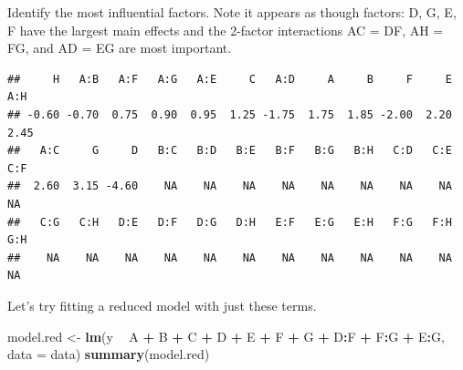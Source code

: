 \documentclass[]{article}
\newenvironment{Shaded}{\begin{snugshade}}{\end{snugshade}}
\newcommand{\DataTypeTok}[1]{\textcolor[rgb]{0.13,0.29,0.53}{#1}}
\newcommand{\DecValTok}[1]{\textcolor[rgb]{0.00,0.00,0.81}{#1}}
\newcommand{\FloatTok}[1]{\textcolor[rgb]{0.00,0.00,0.81}{#1}}
\newcommand{\KeywordTok}[1]{\textcolor[rgb]{0.13,0.29,0.53}{\textbf{#1}}}
\newcommand{\NormalTok}[1]{#1}
\newcommand{\OperatorTok}[1]{\textcolor[rgb]{0.81,0.36,0.00}{\textbf{#1}}}
\newcommand{\OtherTok}[1]{\textcolor[rgb]{0.56,0.35,0.01}{#1}}
\newcommand{\StringTok}[1]{\textcolor[rgb]{0.31,0.60,0.02}{#1}}
\begin{document}
\newpage

Identify the most influential factors. Note it appears as though
factors: D, G, E, F have the largest main effects and the 2-factor
interactions AC = DF, AH = FG, and AD = EG are most important.

\begin{Shaded}
\end{Shaded}

\begin{verbatim}
##     H   A:B   A:F   A:G   A:E     C   A:D     A     B     F     E   A:H 
## -0.60 -0.70  0.75  0.90  0.95  1.25 -1.75  1.75  1.85 -2.00  2.20  2.45 
##   A:C     G     D   B:C   B:D   B:E   B:F   B:G   B:H   C:D   C:E   C:F 
##  2.60  3.15 -4.60    NA    NA    NA    NA    NA    NA    NA    NA    NA 
##   C:G   C:H   D:E   D:F   D:G   D:H   E:F   E:G   E:H   F:G   F:H   G:H 
##    NA    NA    NA    NA    NA    NA    NA    NA    NA    NA    NA    NA
\end{verbatim}

Let's try fitting a reduced model with just these terms.

\begin{Shaded}
\begin{Highlighting}[]
\NormalTok{model.red <-}\StringTok{ }\KeywordTok{lm}\NormalTok{(y }\OperatorTok{~}\StringTok{ }\NormalTok{A }\OperatorTok{+}\StringTok{ }\NormalTok{B }\OperatorTok{+}\StringTok{ }\NormalTok{C }\OperatorTok{+}\StringTok{ }\NormalTok{D }\OperatorTok{+}\StringTok{ }\NormalTok{E }\OperatorTok{+}\StringTok{ }\NormalTok{F }\OperatorTok{+}\StringTok{ }\NormalTok{G }\OperatorTok{+}\StringTok{ }\NormalTok{D}\OperatorTok{:}\NormalTok{F }\OperatorTok{+}\StringTok{ }\NormalTok{F}\OperatorTok{:}\NormalTok{G }\OperatorTok{+}\StringTok{ }\NormalTok{E}\OperatorTok{:}\NormalTok{G, }\DataTypeTok{data =}\NormalTok{ data)}
\KeywordTok{summary}\NormalTok{(model.red)}
\end{Highlighting}
\end{Shaded}
\end{document}
